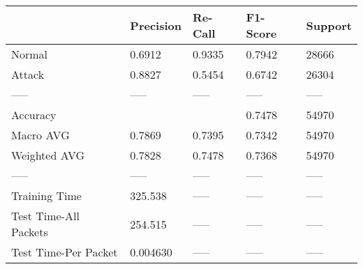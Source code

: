 \begin{tabular}{lllll}
\toprule
{} & Precision & Re-Call & F1-Score & Support \\
\midrule
Normal                &    0.6912 &  0.9335 &   0.7942 &   28666 \\
Attack                &    0.8827 &  0.5454 &   0.6742 &   26304 \\
-----                 &     ----- &   ----- &    ----- &   ----- \\
Accuracy              &           &         &   0.7478 &   54970 \\
Macro AVG             &    0.7869 &  0.7395 &   0.7342 &   54970 \\
Weighted AVG          &    0.7828 &  0.7478 &   0.7368 &   54970 \\
-----                 &     ----- &   ----- &    ----- &   ----- \\
Training Time         &   325.538 &   ----- &    ----- &   ----- \\
Test Time-All Packets &   254.515 &   ----- &    ----- &   ----- \\
Test Time-Per Packet  &  0.004630 &   ----- &    ----- &   ----- \\
\bottomrule
\end{tabular}
